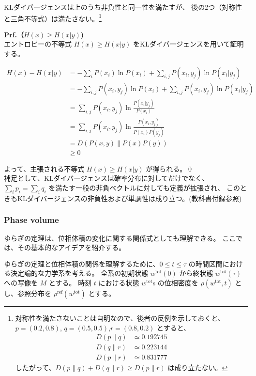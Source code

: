 \documentclass[a4paper,11pt]{jsarticle}
\numberwithin{equation}{section}
\begin{document}
KLダイバージェンスは上のうち非負性と同一性を満たすが、
後の2つ（対称性と三角不等式）は満たさない。\footnote{
    対称性を満たさないことは自明なので、後者の反例を示しておくと、
    $p = (0.2, 0.8)$, $q = (0.5, 0.5)$,$ r = (0.8, 0.2)$ とすると、
    \begin{align}
    D(p \| q) &\simeq 0.192745 \\
    D(q \| r) &\simeq 0.223144 \\
    D(p \| r) &\simeq 0.831777
    \end{align}
    したがって、$D(p \| q) + D(q \| r) \geq D(p \| r)$ は成り立たない。
}

\textbf{Prf.（\( H(x) \geq H(x|y) \))}\\
エントロピーの不等式 \( H(x) \geq H(x|y) \) をKLダイバージェンスを用いて証明する。

\begin{align}
H(x) - H(x|y)
&= - \sum_i P(x_i) \ln P(x_i) + \sum_{i,j} P(x_i, y_j) \ln P(x_i|y_j) \\
&= - \sum_{i,j} P(x_i, y_j) \ln P(x_i) + \sum_{i,j} P(x_i, y_j) \ln P(x_i|y_j) \\
&= \sum_{i,j} P(x_i, y_j) \ln \frac{P(x_i|y_j)}{P(x_i)} \\
&= \sum_{i,j} P(x_i, y_j) \ln \frac{P(x_i, y_j)}{P(x_i) P(y_j)} \\
&= D(P(x, y) \| P(x) P(y)) \\
&\geq 0
\end{align}

よって、主張される不等式 \( H(x) \geq H(x|y) \) が得られる。\qed\\

補足として、KLダイバージェンスは確率分布に対してだけでなく、
$\sum_i p_i = \sum_i q_i$ を満たす一般の非負ベクトルに対しても定義が拡張され、
このときもKLダイバージェンスの非負性および単調性は成り立つ。(教科書付録参照)

\subsubsection{Phase volume}

ゆらぎの定理は、位相体積の変化に関する関係式としても理解できる。
ここでは、その基本的なアイデアを紹介する。

ゆらぎの定理と位相体積の関係を理解するために、$0 \leq t \leq \tau$ の時間区間における決定論的な力学系を考える。
全系の初期状態 $w^{\mathrm{tot}}(0)$ から終状態 $w^{\mathrm{tot}}(\tau)$ への写像を $M$ とする。
時刻 $t$ における状態 $w^{\mathrm{tot}}$s の位相密度を $\rho(w^{\mathrm{tot}}, t)$ とし、参照分布を $\rho^{\mathrm{ref}}(w^{\mathrm{tot}})$ とする。
\end{document}
